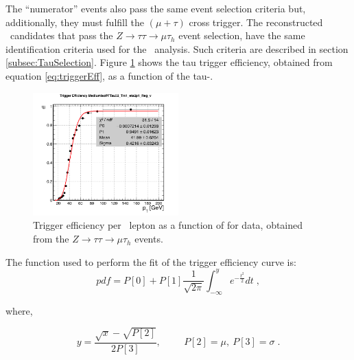 \noindent The ``numerator'' events also pass the same event selection criteria 
but, additionally, they must fulfill the $(\mu+\tau)$ cross trigger. The reconstructed \tauh~candidates
that pass the $Z \rightarrow \tau\tau \rightarrow \mu\tau_{h}$ event selection, have the same 
identification criteria used for the \Zprimetotauh~analysis. Such criteria 
are described in section \ref{subsec:TauSelection}. Figure \ref{fig:triggerEFf}
shows the tau trigger efficiency, obtained from equation \ref{eq:triggerEff}, as a 
function of the tau-\pt.\\

\begin{figure}[ht]
\begin{center}
\captionsetup[subfloat]{farskip=0pt,captionskip=0.0cm,labelformat=empty}
\includegraphics[clip,width=0.5\textwidth]{figuras/Chapter5/DiTauTriggerEfficiency_full_lumi.png}
 \caption{
  Trigger efficiency per \tauh~lepton as a function of \pt for data,
  obtained from the $Z \rightarrow \tau\tau \rightarrow \mu\tau_{h}$ events.
   }\label{fig:triggerEFf}
\end{center}
\end{figure}

\noindent The function used to perform the fit of the trigger efficiency curve is:
\begin{equation}
pdf=P[0]+P[1]\frac{1}{\sqrt{2\pi}}\int_{-\infty}^{y}e^{-\frac{t^{2}}{2}}dt \; ,
\end{equation}

\noindent where,

\begin{equation}
y=\frac{\sqrt{x}-\sqrt{P[2]}}{2P[3]}, \hspace{1cm} P[2]=\mu,\ P[3]=\sigma \; .
\end{equation}

\vspace{0.5cm}

